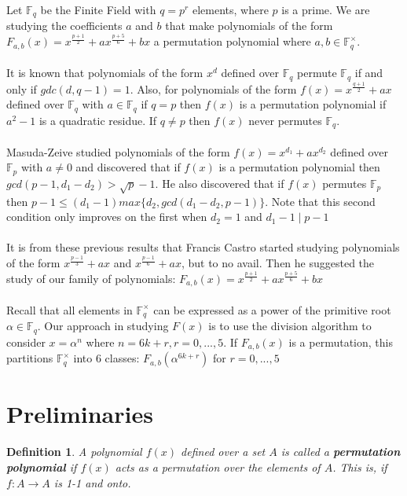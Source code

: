 \documentclass[12pt]{article}
\newtheorem{definition}{Definition}
\begin{document}
Let $\mathbb{F}_{q}$ be the Finite Field with $q=p^{r}$ elements, where $p$ is a prime. We are studying the coefficients $a$ and $b$ that make polynomials of the form $F_{a,b}(x)=x^{\frac{p+1}{2}} + ax^{\frac{p+5}{6}} + bx$ a permutation polynomial where $a,b \in \mathbb{F}_{q}^{\times}$. \\
\\
It is known that polynomials of the form $x^{d}$ defined over $\mathbb{F}_{q}$ permute $\mathbb{F}_{q}$ if and only if $gdc(d,q-1)=1$. Also, for polynomials of the form $f(x)=x^{\frac{q+1}{2}}+ax$ defined over $\mathbb{F}_{q}$ with $a \in \mathbb{F}_{q}$ if $q=p$ then $f(x)$ is a permutation polynomial if $a^{2}-1$ is a quadratic residue. If $q\neq p$ then $f(x)$ never permutes $\mathbb{F}_{q}$.\\
\\
Masuda-Zeive studied polynomials of the form $f(x)=x^{d_{1}}+ax^{d_{2}}$ defined over $\mathbb{F}_{p}$ with $a\neq 0$ and discovered that if $f(x)$ is a permutation polynomial then $gcd(p-1,d_{1}-d_{2})>\sqrt{p}-1$. He also discovered that if $f(x)$ permutes $\mathbb{F}_{p}$ then $p-1\leq (d_{1}-1)max\lbrace d_{2},gcd(d_{1}-d_{2},p-1) \rbrace$. Note that this second condition only improves on the first when $d_{2}=1$ and $d_{1}-1 \mid p-1$ \\
\\
It is from these previous results that Francis Castro started studying polynomials of the form $x^{\frac{p-1}{3}}+ax$ and $x^{\frac{p-1}{6}}+ax$, but to no avail. Then he suggested the study of our family of polynomials: $F_{a,b}(x)=x^{\frac{p+1}{2}} + ax^{\frac{p+5}{6}} + bx$ \\
\\
Recall that all elements in $\mathbb{F}_{q}^{\times}$ can be expressed as a power of the primitive root $\alpha \in \mathbb{F}_{q}$. Our approach in studying $F(x)$ is to use the division algorithm to consider $x=\alpha^{n}$ where $n=6k+r, r=0,...,5$. If $F_{a,b}(x)$ is a permutation, this partitions $\mathbb{F}_{q}^{\times}$ into 6 classes: $F_{a,b}(\alpha^{6k+r})$ for $r=0,...,5$


\section{Preliminaries}\label{prelim}

\begin{definition}
	A polynomial $f(x)$ defined over a set $A$ is called a \textbf{permutation polynomial} if $f(x)$ acts as a permutation over the elements of $A$. This is, if $f: A \rightarrow A$ is 1-1 and onto.
\end{definition}
\end{document}
